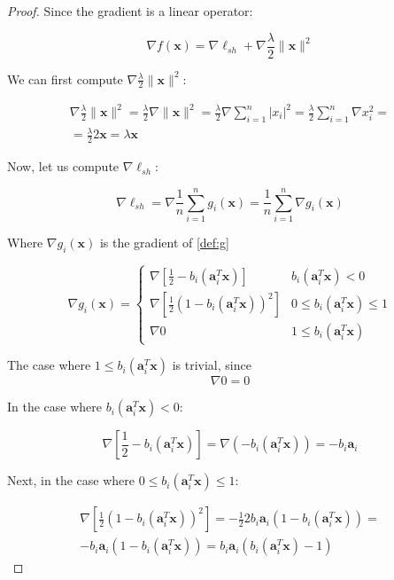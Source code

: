 \documentclass[12pt]{article}
\newcommand{\xb}{\mathbf{x}}
\newcommand{\ab}{\mathbf{a}}
\newcommand{\abi}{\ab_i}
\newcommand{\xnorm}{\lVert \mathbf{\xb} \rVert}
\newcommand{\sumin}{\sum_{i = 1}^n}
\newcommand{\ellsh}{\ell_{sh}}
\newcommand{\ax}{\abi^T\xb}
\newcommand{\fracn}{\frac{1}{n}}
\newcommand{\linearpred}{b_i(\ax) < 0}
\newcommand{\quadrpred}{0 \leq b_i(\ax) \leq 1}
\begin{document}
\begin{proof}
Since the gradient is a linear operator:

\begin{equation}
    \nabla f(\xb) = \nabla \ellsh + \nabla \frac{\lambda}{2} \xnorm ^ 2
\end{equation}

We can first compute $\nabla \frac{\lambda}{2} \xnorm ^2$:

\begin{gather}
    \nabla \frac{\lambda}{2} \xnorm ^ 2 =
    \frac{\lambda}{2} \nabla \xnorm ^ 2 =
    \frac{\lambda}{2} \nabla \sumin |x_i|^2 = \nonumber
    \frac{\lambda}{2} \sumin \nabla x_i^2 = \\
     = \frac{\lambda}{2}2\xb =
    \lambda \xb \label{eq:grad_lambda}
\end{gather}

Now, let us compute $\nabla \ellsh$:

\begin{equation}
    \nabla \ellsh = \nabla \fracn \sumin g_i(\xb) = \fracn \sumin \nabla g_i(\xb)
\end{equation}

Where $\nabla g_i(\xb)$ is the gradient of \eqref{def:g}

\begin{equation}
    \nabla g_i(\xb) = \begin{cases}
        \nabla \left [\frac{1}{2} - b_i(\ax)\right]         & \linearpred \\
        \nabla \left [\frac{1}{2}(1 - b_i(\ax))^2\right]    & \quadrpred \\
        \nabla 0                                            & 1 \le b_i(\ax)
    \end{cases}
\end{equation}

The case where $1 \le b_i(\ax)$ is trivial, since
\begin{equation} \label{eq:grad_0_case}
    \nabla 0 = 0
\end{equation}

In the case where $\linearpred$:

\begin{equation} \label{eq:grad_linear_case}
    \nabla \left [\frac{1}{2} - b_i(\ax)\right] = \nabla (-b_i(\ax)) = -b_i\abi
\end{equation}

Next, in the case where $\quadrpred$:

\begin{gather}
    \nabla \left [\frac{1}{2}(1 - b_i(\ax))^2\right] = \nonumber
    -\frac{1}{2} 2 b_i\abi(1 - b_i(\ax)) = \\ \label{eq:grad_quadr_case}
    -b_i\abi(1 - b_i(\ax)) = b_i\abi(b_i(\ax) - 1)
\end{gather}


\end{proof}
\end{document}
